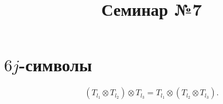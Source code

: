 \documentclass[a4paper]{article}
\title{Семинар №7}
\begin{document}
	\maketitle
\section*{$6j$-символы}
\[
	\left( T_{l_1} \otimes T_{l_2} \right) 
	\otimes T_{l_3}= T_{l_1} \otimes 
	\left( T_{l_2} \otimes T_{l_3} \right) 
.\] 
\end{document}

